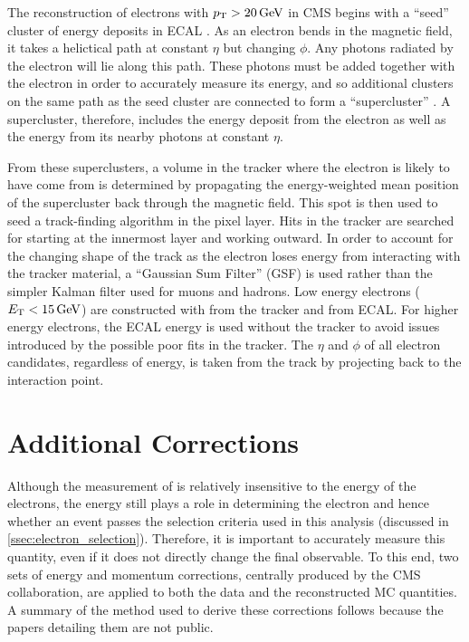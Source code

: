 The reconstruction of electrons with $p_{\mathrm{T}} > 20 \,\text{Ge\hspace{-.08em}V}$ in CMS begins with a
``seed'' cluster of energy deposits in ECAL \cite{eg_reco_2010}. As an electron
bends in the magnetic field, it takes a helictical path at constant $\eta$ but
changing $\phi$. Any photons radiated by the electron will lie along this path.
These photons must be added together with the electron in order to accurately
measure its energy, and so additional clusters on the same path as the seed
cluster are connected to form a ``supercluster'' \cite{baffioni_2007}. A
supercluster, therefore, includes the energy deposit from the electron as well
as the energy from its nearby photons at constant $\eta$.

From these superclusters, a volume in the tracker where the electron is likely
to have come from is determined by propagating the energy-weighted mean
position of the supercluster back through the magnetic field. This spot is then
used to seed a track-finding algorithm in the pixel layer. Hits in the tracker
are searched for starting at the innermost layer and working outward. In order
to account for the changing shape of the track as the electron loses energy
from interacting with the tracker material, a ``Gaussian Sum Filter'' (GSF)
\cite{adam_2005} is used rather than the simpler Kalman filter used for muons
and hadrons. Low energy electrons ($E_{\mathrm{T}} < 15 \,\text{Ge\hspace{-.08em}V}$) are constructed with \pt
from the tracker and \ET from ECAL. For higher energy electrons, the ECAL
energy is used without the tracker \pt to avoid issues introduced by the
possible poor fits in the tracker. The $\eta$ and $\phi$ of all electron
candidates, regardless of energy, is taken from the track by projecting back to
the interaction point.

\section{Additional Corrections}
\label{sec:corrections}

Although the measurement of \phistar is relatively insensitive to the energy of
the electrons, the energy still plays a role in determining the electron \pt
and hence whether an event passes the selection criteria used in this analysis
(discussed in \cref{ssec:electron_selection}). Therefore, it is important
to accurately measure this quantity, even if it does not directly change the
final observable. To this end, two sets of energy and momentum corrections,
centrally produced by the CMS collaboration, are applied to both the
data and the reconstructed MC quantities. A summary of the method used to
derive these corrections follows because the papers detailing them are not
public.

